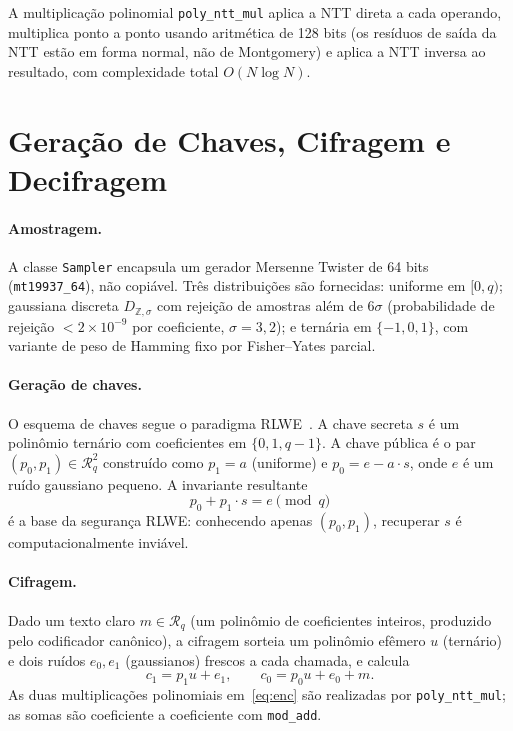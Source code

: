 \documentclass[11pt,a4paper]{article}
\newcommand{\Rq}{\mathcal{R}_q}
\begin{document}
A multiplicação polinomial \texttt{poly\_ntt\_mul} aplica a NTT direta a cada operando,
multiplica ponto a ponto usando aritmética de 128 bits (os resíduos de saída da NTT
estão em forma normal, não de Montgomery) e aplica a NTT inversa ao resultado, com
complexidade total $O(N\log N)$.

\section{Geração de Chaves, Cifragem e Decifragem}
\label{sec:crypto}

\paragraph{Amostragem.}
A classe \texttt{Sampler} encapsula um gerador Mersenne Twister de 64 bits
(\texttt{mt19937\_64}), não copiável. Três distribuições são fornecidas: uniforme em
$[0, q)$; gaussiana discreta $D_{\mathbb{Z},\sigma}$ com rejeição de amostras além de
$6\sigma$ (probabilidade de rejeição $< 2 \times 10^{-9}$ por coeficiente, $\sigma =
3{,}2$); e ternária em $\{-1, 0, 1\}$, com variante de peso de Hamming fixo por
Fisher--Yates parcial.

\paragraph{Geração de chaves.}
O esquema de chaves segue o paradigma RLWE~\cite{LPR2010}. A chave secreta $s$ é um
polinômio ternário com coeficientes em $\{0, 1, q{-}1\}$. A chave pública é o par
$(p_0, p_1) \in \Rq^2$ construído como $p_1 = a$ (uniforme) e $p_0 = e - a \cdot s$,
onde $e$ é um ruído gaussiano pequeno. A invariante resultante
\begin{equation}
  p_0 + p_1 \cdot s = e \pmod{q}
  \label{eq:pk}
\end{equation}
é a base da segurança RLWE: conhecendo apenas $(p_0, p_1)$, recuperar $s$ é
computacionalmente inviável.

\paragraph{Cifragem.}
Dado um texto claro $m \in \Rq$ (um polinômio de coeficientes inteiros, produzido pelo
codificador canônico), a cifragem sorteia um polinômio efêmero $u$ (ternário) e dois
ruídos $e_0, e_1$ (gaussianos) frescos a cada chamada, e calcula
\begin{equation}
  c_1 = p_1 u + e_1, \qquad c_0 = p_0 u + e_0 + m.
  \label{eq:enc}
\end{equation}
As duas multiplicações polinomiais em~\eqref{eq:enc} são realizadas por
\texttt{poly\_ntt\_mul}; as somas são coeficiente a coeficiente com \texttt{mod\_add}.
\end{document}
